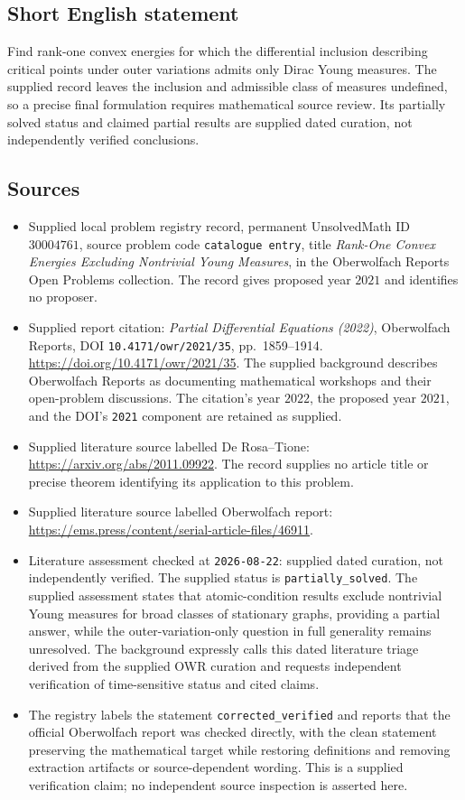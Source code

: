\documentclass[11pt]{article}
\begin{document}
\subsection{Short English statement}
Find rank-one convex energies for which the differential inclusion describing critical points under outer variations admits only Dirac Young measures. The supplied record leaves the inclusion and admissible class of measures undefined, so a precise final formulation requires mathematical source review. Its partially solved status and claimed partial results are supplied dated curation, not independently verified conclusions.
\subsection{Sources}
\begin{itemize}
\item Supplied local problem registry record, permanent UnsolvedMath ID \(30004761\), source problem code \texttt{catalogue entry}, title \emph{Rank-One Convex Energies Excluding Nontrivial Young Measures}, in the Oberwolfach Reports Open Problems collection. The record gives proposed year \(2021\) and identifies no proposer.
\item Supplied report citation: \emph{Partial Differential Equations (2022)}, Oberwolfach Reports, DOI \texttt{10.4171/owr/2021/35}, pp.\ 1859--1914. \url{https://doi.org/10.4171/owr/2021/35}. The supplied background describes Oberwolfach Reports as documenting mathematical workshops and their open-problem discussions. The citation's year \(2022\), the proposed year \(2021\), and the DOI's \texttt{2021} component are retained as supplied.
\item Supplied literature source labelled De Rosa--Tione: \url{https://arxiv.org/abs/2011.09922}. The record supplies no article title or precise theorem identifying its application to this problem.
\item Supplied literature source labelled Oberwolfach report: \url{https://ems.press/content/serial-article-files/46911}.
\item Literature assessment checked at \texttt{2026-08-22}: supplied dated curation, not independently verified. The supplied status is \texttt{partially\_solved}. The supplied assessment states that atomic-condition results exclude nontrivial Young measures for broad classes of stationary graphs, providing a partial answer, while the outer-variation-only question in full generality remains unresolved. The background expressly calls this dated literature triage derived from the supplied OWR curation and requests independent verification of time-sensitive status and cited claims.
\item The registry labels the statement \texttt{corrected\_verified} and reports that the official Oberwolfach report was checked directly, with the clean statement preserving the mathematical target while restoring definitions and removing extraction artifacts or source-dependent wording. This is a supplied verification claim; no independent source inspection is asserted here.
\end{itemize}
\end{document}
